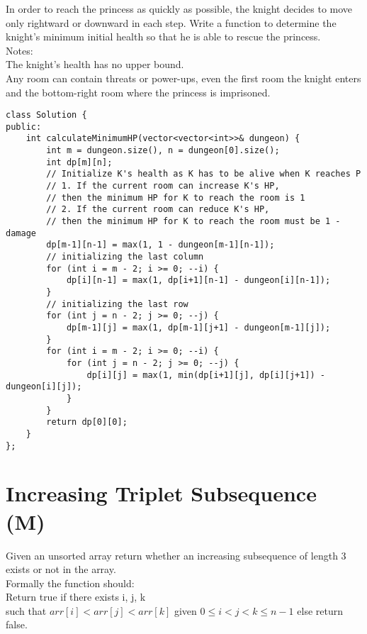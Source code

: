 In order to reach the princess as quickly as possible, the knight decides to move only rightward or downward in each step. Write a function to determine the knight's minimum initial health so that he is able to rescue the princess.\\

Notes:\\
    The knight's health has no upper bound.\\
    Any room can contain threats or power-ups, even the first room the knight enters and the bottom-right room where the princess is imprisoned.\\

\begin{lstlisting}
class Solution {
public:
    int calculateMinimumHP(vector<vector<int>>& dungeon) {
        int m = dungeon.size(), n = dungeon[0].size();
        int dp[m][n];
        // Initialize K's health as K has to be alive when K reaches P
        // 1. If the current room can increase K's HP, 
        // then the minimum HP for K to reach the room is 1
        // 2. If the current room can reduce K's HP,
        // then the minimum HP for K to reach the room must be 1 - damage
        dp[m-1][n-1] = max(1, 1 - dungeon[m-1][n-1]);
        // initializing the last column
        for (int i = m - 2; i >= 0; --i) {
            dp[i][n-1] = max(1, dp[i+1][n-1] - dungeon[i][n-1]); 
        }
        // initializing the last row
        for (int j = n - 2; j >= 0; --j) {
            dp[m-1][j] = max(1, dp[m-1][j+1] - dungeon[m-1][j]); 
        }
        for (int i = m - 2; i >= 0; --i) {
            for (int j = n - 2; j >= 0; --j) {
                dp[i][j] = max(1, min(dp[i+1][j], dp[i][j+1]) - dungeon[i][j]);
            }
        }
        return dp[0][0];
    }
};
\end{lstlisting}


\section{Increasing Triplet Subsequence (M)}
Given an unsorted array return whether an increasing subsequence of length 3 exists or not in the array.\\

Formally the function should:\\
    Return true if there exists i, j, k\\
    such that $arr[i] < arr[j] < arr[k]$ given $0 \leq i < j < k \leq n-1$ else return false. \\

